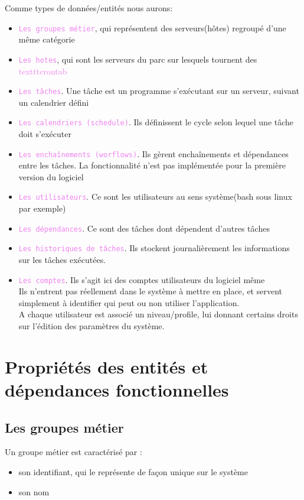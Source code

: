 \documentclass{bouygues-fr}
\begin{document}
Comme types de données/entités nous aurons:
\begin{itemize}
  \item  \textcolor{violet}{\texttt{Les groupes métier}}, qui représentent des serveurs(hôtes) regroupé d'une même catégorie
  \item  \textcolor{violet}{\texttt{Les hotes}}, qui sont les serveurs du parc sur lesquels tournent des \textcolor{violet}{texttt{crontab}}
  \item  \textcolor{violet}{\texttt{Les tâches}}. Une tâche est un programme s'exécutant sur un serveur, suivant un calendrier défini
  \item  \textcolor{violet}{\texttt{Les calendriers (schedule)}}. Ils définissent le cycle selon lequel une tâche doit s'exécuter
  \item  \textcolor{violet}{\texttt{Les enchaînements (worflows)}}. Ils gèrent enchaînements et dépendances entre les tâches. La fonctionnalité n'est pas implémentée pour la première version du logiciel
  \item  \textcolor{violet}{\texttt{Les utilisateurs}}. Ce sont les utilisateurs au sens système(bash sous linux par exemple)
  \item  \textcolor{violet}{\texttt{Les dépendances}}. Ce sont des tâches dont dépendent d'autres tâches
  \item  \textcolor{violet}{\texttt{Les historiques de tâches}}. Ils stockent journalièrement les informations sur les tâches exécutées.
  \item  \textcolor{violet}{\texttt{Les comptes}}. Ils s'agit ici des comptes utilisateurs du logiciel même\\
    Ils n'entrent pas réellement dans le système à mettre en place, et servent simplement à identifier qui peut ou non utiliser l'application.\\
    A chaque utilisateur est associé un niveau/profile, lui donnant certains droits sur l'édition des paramètres du système.
\end{itemize}

\vspace{20pt}
\chapter{Propriétés des entités et dépendances fonctionnelles}

\section{Les groupes métier}
Un groupe métier est caractérisé par :
\begin{itemize}
\item son identifiant, qui le représente de façon unique sur le système
\item son nom
\end{itemize} 
\end{document}
